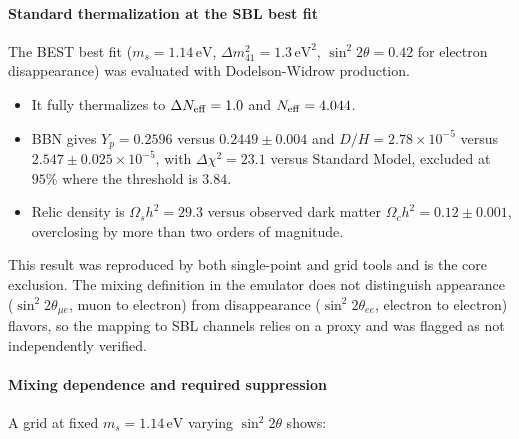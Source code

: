 \documentclass[11pt,a4paper]{article}
\begin{document}
\paragraph{Standard thermalization at the SBL best fit}
The BEST best fit ($m_s = 1.14\,\mathrm{eV}$, $\Delta m^2_{41} = 1.3\,\mathrm{eV}^2$, $\sin^2 2\theta = 0.42$ for electron disappearance) was evaluated with Dodelson-Widrow production.

\begin{itemize}
  \item It fully thermalizes to $\Delta N_{\rm eff} = 1.0$ and $N_{\rm eff} = 4.044$.
  \item BBN gives $Y_p = 0.2596$ versus $0.2449 \pm 0.004$ and $D/H = 2.78 \times 10^{-5}$ versus $2.547 \pm 0.025 \times 10^{-5}$, with $\Delta \chi^2 = 23.1$ versus Standard Model, excluded at $95\%$ where the threshold is $3.84$.
  \item Relic density is $\Omega_s h^2 = 29.3$ versus observed dark matter $\Omega_c h^2 = 0.12 \pm 0.001$, overclosing by more than two orders of magnitude.
\end{itemize}
This result was reproduced by both single-point and grid tools and is the core exclusion. The mixing definition in the emulator does not distinguish appearance ($\sin^2 2\theta_{\mu e}$, muon to electron) from disappearance ($\sin^2 2\theta_{ee}$, electron to electron) flavors, so the mapping to SBL channels relies on a proxy and was flagged as not independently verified.

\paragraph{Mixing dependence and required suppression}
A grid at fixed $m_s = 1.14\,\mathrm{eV}$ varying $\sin^2 2\theta$ shows:
\end{document}
